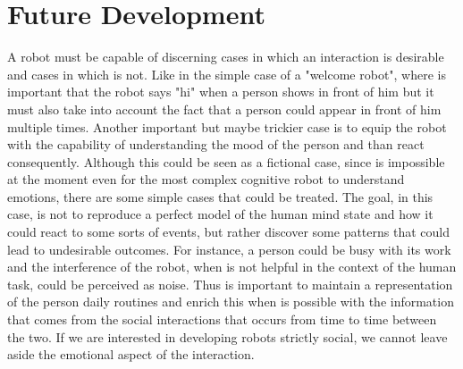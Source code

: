 \documentclass[pdftex,12pt,a4paper]{report}
\begin{document}
\section{Future Development}
A robot must be capable of discerning cases in which an interaction is desirable and cases in which is not. Like in the simple case of a "welcome robot", where is important that the robot says "hi" when a person shows in front of him but it must also take into account the fact that a person could appear in front of him multiple times. 
Another important but maybe trickier case is to equip the robot with the capability of understanding the mood of the person and than react consequently. Although this could be seen as a fictional case, since is impossible at the moment even for the most complex cognitive robot to understand emotions, there are some simple cases that could be treated. The goal, in this case, is not to reproduce a perfect model of the human mind state and how it could react to some sorts of events, but rather discover some patterns that could lead to undesirable outcomes. For instance, a person could be busy with its work and the interference of the robot, when is not helpful in the context of the human task, could be perceived as noise. Thus is important to maintain a representation of the person daily routines and enrich this when is possible with the information that comes from the social interactions that occurs from time to time between the two. If we are interested in developing robots strictly social, we cannot leave aside the emotional aspect of the interaction. 
\end{document}
